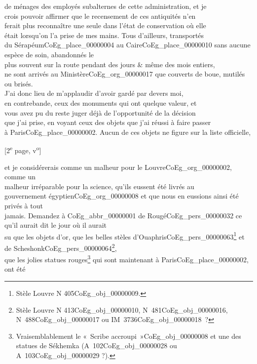 \documentclass{book}
\begin{document}
de ménages des employés subalternes de cette administration, et je\\
crois pouvoir affirmer que le recensement de ces antiquités n’en\\
ferait plus reconnaître une seule dans l’état de conservation où elle\\
était lorsqu’on l’a prise de mes mains. Tous d’ailleurs, transportés\\
du Sérapéum\gls{CoEg_place_00000004} au Caire\gls{CoEg_place_00000010} sans aucune espèce de soin, abandonnés le\\
plus souvent sur la route pendant des jours \& même des mois entiers,\\
ne sont arrivés au Ministère\gls{CoEg_org_00000017} que couverts de boue, mutilés ou brisés.\\
J’ai donc lieu de m’applaudir d’avoir gardé par devers moi,\\
en contrebande, ceux des monuments qui ont quelque valeur, et\\
vous avez pu du reste juger déjà de l’opportunité de la décision\\
que j’ai prise, en voyant ceux des objets que j’ai réussi à faire passer\\
à Paris\gls{CoEg_place_00000002}. Aucun de ces objets ne figure sur la liste officielle,
{\footnotesize\begin{center} {[2\textsuperscript{e} page, v\textsuperscript{o}]}\end{center}}
\noindent et je considérerais comme un malheur pour le Louvre\gls{CoEg_org_00000002}, comme un\\
malheur irréparable pour la science, qu’ils eussent été livrés au\\
gouvernement égyptien\gls{CoEg_org_00000008} et que nous en eussions ainsi été privés à tout\\
jamais. Demandez à \gls{CoEg_abbr_00000001} de Rougé\gls{CoEg_pers_00000032} ce qu’il aurait dit le jour où il aurait\\
su que les objets d’or, que les belles stèles d’Ouaphris\gls{CoEg_pers_00000063}\footnote{Stèle Louvre N 405\gls{CoEg_obj_00000009}.} et de Scheshonk\gls{CoEg_pers_00000064}\footnote{Stèle Louvre N 413\gls{CoEg_obj_00000010}, N~481\gls{CoEg_obj_00000016}, N~488\gls{CoEg_obj_00000017} ou IM~3736\gls{CoEg_obj_00000018}~?},\\
que les jolies statues rouges\footnote{Vraisemblablement le «~Scribe accroupi~»\gls{CoEg_obj_00000008} et une des statues de Sékhemka (A~102\gls{CoEg_obj_00000028} ou A~103\gls{CoEg_obj_00000029} ?).} qui sont maintenant à Paris\gls{CoEg_place_00000002}, ont été\\
\end{document}
